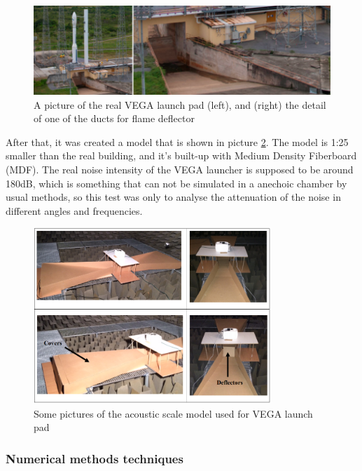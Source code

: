 \begin{figure}[h]
	\centering
	\includegraphics[width=\textwidth]{img/vega_real.png}
	\caption[VEGA launch pad]
	{A picture of the real VEGA launch pad (left), and (right) the detail of
	one of the ducts for flame deflector}
	\label{fig:vega_real}
\end{figure}

After that, it was created a model that is shown in picture \ref{fig:vega_model}.
The model is 1:25 smaller than the real building, and it's built-up with Medium
Density Fiberboard (MDF). The real noise intensity of the VEGA launcher is supposed
to be around 180dB, which is something that can not be simulated in a anechoic chamber
by usual methods, so this test was only to analyse the attenuation of the noise in
different angles and frequencies.

\begin{figure}[h]
	\centering
	\includegraphics[width=0.8\textwidth]{img/vega_model.png}
	\caption[Scale model of VEGA launch pad for acoustic experiment]
	{Some pictures of the acoustic scale model used for VEGA launch pad}
	\label{fig:vega_model}
\end{figure}

\subsubsection{Numerical methods techniques}

